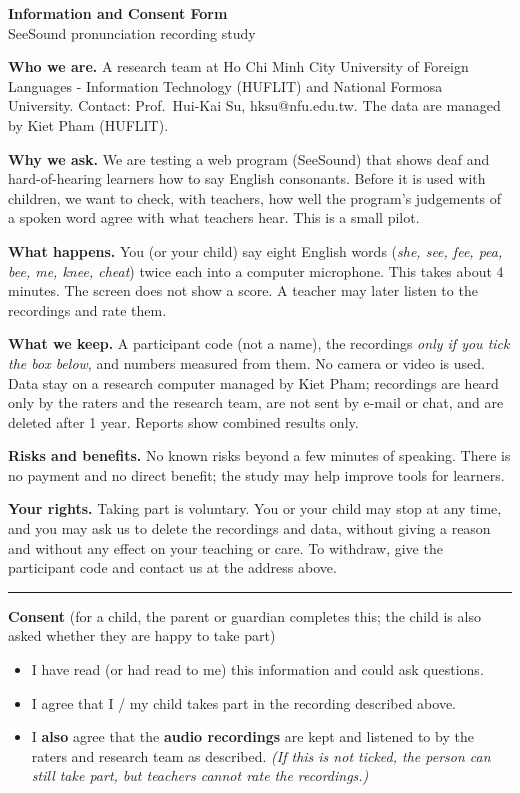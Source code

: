 \documentclass[11pt,a4paper]{article}
\begin{document}
\begin{center}{\Large\bfseries Information and Consent Form}\\[2pt]
SeeSound pronunciation recording study\end{center}

\textbf{Who we are.} A research team at Ho Chi Minh City University of Foreign Languages - Information Technology (HUFLIT) and National Formosa University. Contact: Prof.\ Hui-Kai Su, hksu@nfu.edu.tw. The data are managed by Kiet Pham (HUFLIT).

\textbf{Why we ask.} We are testing a web program (SeeSound) that shows deaf and hard-of-hearing learners how to say English consonants. Before it is used with children, we want to check, with teachers, how well the program's judgements of a spoken word agree with what teachers hear. This is a small pilot.

\textbf{What happens.} You (or your child) say eight English words (\textit{she, see, fee, pea, bee, me, knee, cheat}) twice each into a computer microphone. This takes about 4 minutes. The screen does not show a score. A teacher may later listen to the recordings and rate them.

\textbf{What we keep.} A participant code (not a name), the recordings \emph{only if you tick the box below}, and numbers measured from them. No camera or video is used. Data stay on a research computer managed by Kiet Pham; recordings are heard only by the raters and the research team, are not sent by e-mail or chat, and are deleted after 1 year. Reports show combined results only.

\textbf{Risks and benefits.} No known risks beyond a few minutes of speaking. There is no payment and no direct benefit; the study may help improve tools for learners.

\textbf{Your rights.} Taking part is voluntary. You or your child may stop at any time, and you may ask us to delete the recordings and data, without giving a reason and without any effect on your teaching or care. To withdraw, give the participant code and contact us at the address above.

\medskip\hrule\medskip
\textbf{Consent} (for a child, the parent or guardian completes this; the child is also asked whether they are happy to take part)

\begin{itemize}[label=$\square$]
\item I have read (or had read to me) this information and could ask questions.
\item I agree that I / my child takes part in the recording described above.
\item I \textbf{also} agree that the \textbf{audio recordings} are kept and listened to by the raters and research team as described. \textit{(If this is not ticked, the person can still take part, but teachers cannot rate the recordings.)}
\end{itemize}
\end{document}
